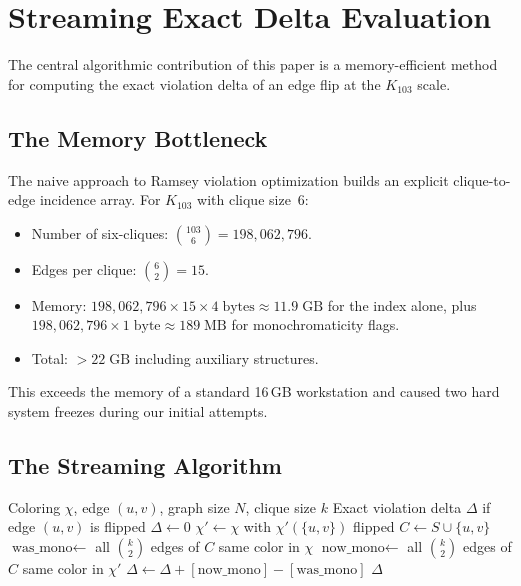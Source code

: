 \documentclass[11pt,a4paper]{article}
\theoremstyle{plain}
\theoremstyle{remark}
\begin{document}
\section{Streaming Exact Delta Evaluation}
\label{sec:streaming}

The central algorithmic contribution of this paper is a memory-efficient
method for computing the exact violation delta of an edge flip at the
$K_{103}$ scale.

\subsection{The Memory Bottleneck}

The naive approach to Ramsey violation optimization builds an explicit
clique-to-edge incidence array. For $K_{103}$ with clique size~6:
\begin{itemize}[leftmargin=2em]
  \item Number of six-cliques: $\binom{103}{6} = 198{,}062{,}796$.
  \item Edges per clique: $\binom{6}{2} = 15$.
  \item Memory: $198{,}062{,}796 \times 15 \times 4\;\text{bytes}
    \approx 11.9\;\text{GB}$ for the index alone, plus
    $198{,}062{,}796 \times 1\;\text{byte} \approx 189\;\text{MB}$
    for monochromaticity flags.
  \item Total: $> 22\;\text{GB}$ including auxiliary structures.
\end{itemize}

This exceeds the memory of a standard 16\,GB workstation and caused
two hard system freezes during our initial attempts.

\subsection{The Streaming Algorithm}

\begin{algorithm}[H]
\caption{Streaming Exact Delta for Edge $(u,v)$ in $K_N$, Clique Size $k$}
\label{alg:streaming}
\begin{algorithmic}[1]
\Require Coloring $\chi$, edge $(u,v)$, graph size $N$, clique size $k$
\Ensure Exact violation delta $\Delta$ if edge $(u,v)$ is flipped
\State $\Delta \gets 0$
\State $\chi' \gets \chi$ with $\chi'(\{u,v\})$ flipped
  \State $C \gets S \cup \{u, v\}$ 
  \State $\text{was\_mono} \gets$ all $\binom{k}{2}$ edges of $C$ same color in $\chi$
  \State $\text{now\_mono} \gets$ all $\binom{k}{2}$ edges of $C$ same color in $\chi'$
  \State $\Delta \gets \Delta + [\text{now\_mono}] - [\text{was\_mono}]$
\EndFor
\State \Return $\Delta$
\end{algorithmic}
\end{algorithm}
\end{document}
